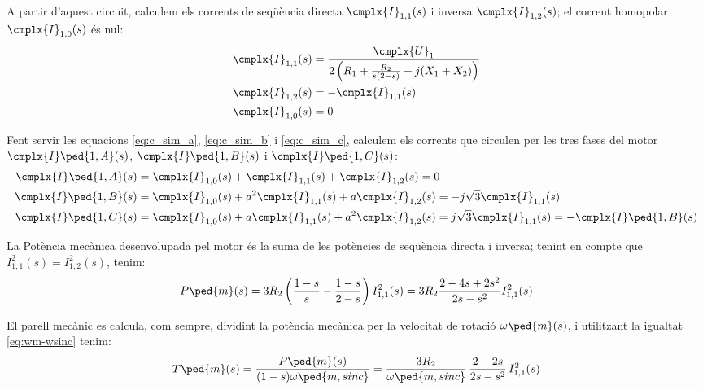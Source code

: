 \begin{center}
	
	\label{pic:mot-esq-equiv-fase-oberta}
\end{center}

A partir d'aquest circuit, calculem els corrents de seqüència directa $\cmplx{I}_{1,1}(s)$ i  inversa $\cmplx{I}_{1,2}(s)$; el corrent homopolar $\cmplx{I}_{1,0}(s)$ és nul:
\begin{subequations}
\begin{align}
	\cmplx{I}_{1,1}(s) &= \frac{\cmplx{U}_1}{2 \left( R_1 + \frac{ R_2}{s(2-s)} + j (X_1+X_2) \right)}\label{eq:I-op-1} \\
	\cmplx{I}_{1,2}(s)  &= -\cmplx{I}_{1,1}(s)\label{eq:I-op-2} \\
	\cmplx{I}_{1,0}(s)  &= 0\label{eq:I-op-0}
\end{align}
\end{subequations}
	
Fent servir les equacions	\eqref{eq:c_sim_a}, \eqref{eq:c_sim_b} i \eqref{eq:c_sim_c}, calculem els corrents que circulen per les tres fases del motor $\cmplx{I}\ped{1,A}(s)$, $\cmplx{I}\ped{1,B}(s)$ i $\cmplx{I}\ped{1,C}(s)$:
\begin{subequations}
\begin{align}
	\cmplx{I}\ped{1,A}(s) &=  \cmplx{I}_{1,0}(s) + \cmplx{I}_{1,1}(s) + \cmplx{I}_{1,2}(s) = 0\label{eq:I-op-A} \\
	\cmplx{I}\ped{1,B}(s)  &=  \cmplx{I}_{1,0}(s) + a^2 \cmplx{I}_{1,1}(s) + a \cmplx{I}_{1,2}(s) = -j \sqrt{3}  \cmplx{I}_{1,1}(s)\label{eq:I-op-B} \\
	\cmplx{I}\ped{1,C}(s)  &=  \cmplx{I}_{1,0}(s) + a \cmplx{I}_{1,1}(s) + a^2 \cmplx{I}_{1,2}(s) = j \sqrt{3}  \cmplx{I}_{1,1}(s) = -\cmplx{I}\ped{1,B}(s)\label{eq:I-op-C}
\end{align}
\end{subequations}

 
La Potència mecànica desenvolupada pel motor és la suma de les potències de seqüència directa i inversa;  tenint en compte que $I_{1,1}^2(s) = I_{1,2}^2(s)$, tenim:
\begin{equation}
	P\ped{m}(s) = 3 R_2 \left(\frac{1-s}{s} - \frac{1-s}{2-s} \right) I_{1,1}^2(s)  = 3 R_2 \frac{2 - 4s + 2s^2}{2s - s^2}  I_{1,1}^2(s) \label{eq:P_m-op} 
\end{equation}

El parell mecànic es calcula, com sempre, dividint la potència mecànica per la velocitat de rotació $\omega\ped{m}(s)$, i utilitzant la igualtat \eqref{eq:wm-wsinc} tenim:
\begin{equation}
	T\ped{m}(s) = \frac{P\ped{m}(s)}{(1-s) \omega\ped{m,sinc}} = \frac{3 R_2}{\omega\ped{m,sinc}} \,\frac{2-2s}{2s-s^2}  \,I_{1,1}^2(s)\label{eq:T_m-op}
\end{equation}
	    	    
